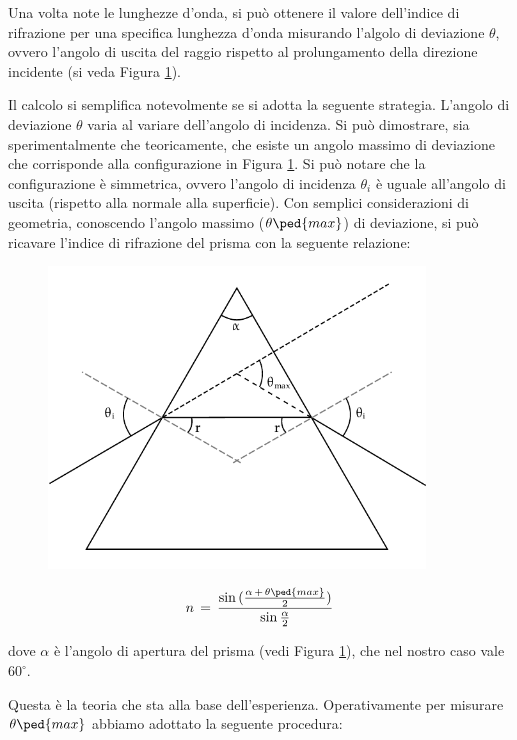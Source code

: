 Una volta note le lunghezze d'onda, si può ottenere il valore dell'indice di rifrazione per una specifica lunghezza d'onda misurando l'algolo di deviazione $\theta$, ovvero l'angolo di uscita del raggio rispetto al prolungamento della direzione incidente (si veda Figura \ref{fig:prisma}).

Il calcolo si semplifica notevolmente se si adotta la seguente strategia. L'angolo di deviazione $\theta$ varia al variare dell'angolo di incidenza. Si può dimostrare, sia sperimentalmente che teoricamente, che esiste un angolo massimo di deviazione che corrisponde alla configurazione in Figura \ref{fig:prisma}. Si può notare che la configurazione è simmetrica, ovvero l'angolo di incidenza $\theta_i$ è uguale all'angolo di uscita (rispetto alla normale alla superficie). Con semplici considerazioni di geometria, conoscendo l'angolo massimo ($\theta\ped{max}$) di deviazione, si può ricavare l'indice di rifrazione del prisma con la seguente relazione:

\begin{figure}
    \includegraphics[width=10cm]{prisma1.pdf}
    \caption{}
    \label{fig:prisma}
\end{figure}

\begin{equation}
	n \,=\, \frac{\sin{(\frac{\alpha \,+\, \theta\ped{max}}{2})}}{\sin{\frac{\alpha}{2}}}
	\label{indice_rif}
\end{equation}

dove $\alpha$ è l'angolo di apertura del prisma (vedi Figura \ref{fig:prisma}), che nel nostro caso vale $60^\circ$.

Questa è la teoria che sta alla base dell'esperienza. Operativamente per misurare $\theta\ped{max}$ abbiamo adottato la seguente procedura:

